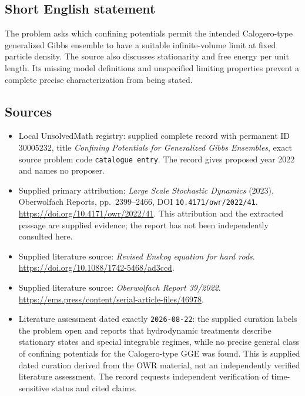 \documentclass[11pt]{article}
\begin{document}
\subsection{Short English statement}
The problem asks which confining potentials permit the intended Calogero-type generalized Gibbs ensemble to have a suitable infinite-volume limit at fixed particle density. The source also discusses stationarity and free energy per unit length. Its missing model definitions and unspecified limiting properties prevent a complete precise characterization from being stated.
\subsection{Sources}
\begin{itemize}
\item Local UnsolvedMath registry: supplied complete record with permanent ID \(30005232\), title \emph{Confining Potentials for Generalized Gibbs Ensembles}, exact source problem code \texttt{catalogue entry}. The record gives proposed year 2022 and names no proposer.
\item Supplied primary attribution: \emph{Large Scale Stochastic Dynamics} (2023), Oberwolfach Reports, pp.\ 2399--2466, DOI \texttt{10.4171/owr/2022/41}. \url{https://doi.org/10.4171/owr/2022/41}. This attribution and the extracted passage are supplied evidence; the report has not been independently consulted here.
\item Supplied literature source: \emph{Revised Enskog equation for hard rods}. \url{https://doi.org/10.1088/1742-5468/ad3ccd}.
\item Supplied literature source: \emph{Oberwolfach Report 39/2022}. \url{https://ems.press/content/serial-article-files/46978}.
\item Literature assessment dated exactly \texttt{2026-08-22}: the supplied curation labels the problem open and reports that hydrodynamic treatments describe stationary states and special integrable regimes, while no precise general class of confining potentials for the Calogero-type GGE was found. This is supplied dated curation derived from the OWR material, not an independently verified literature assessment. The record requests independent verification of time-sensitive status and cited claims.
\end{itemize}
\end{document}
